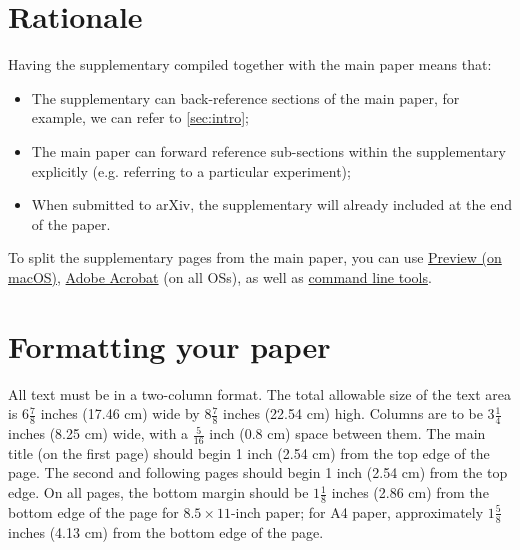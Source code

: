 \clearpage
\setcounter{page}{1}
\maketitlesupplementary


\section{Rationale}
\label{sec:rationale}
% 
Having the supplementary compiled together with the main paper means that:
% 
\begin{itemize}
\item The supplementary can back-reference sections of the main paper, for example, we can refer to \cref{sec:intro};
\item The main paper can forward reference sub-sections within the supplementary explicitly (e.g. referring to a particular experiment); 
\item When submitted to arXiv, the supplementary will already included at the end of the paper.
\end{itemize}
% 
To split the supplementary pages from the main paper, you can use \href{https://support.apple.com/en-ca/guide/preview/prvw11793/mac#:~:text=Delete%20a%20page%20from%20a,or%20choose%20Edit%20%3E%20Delete).}{Preview (on macOS)}, \href{https://www.adobe.com/acrobat/how-to/delete-pages-from-pdf.html#:~:text=Choose%20%E2%80%9CTools%E2%80%9D%20%3E%20%E2%80%9COrganize,or%20pages%20from%20the%20file.}{Adobe Acrobat} (on all OSs), as well as \href{https://superuser.com/questions/517986/is-it-possible-to-delete-some-pages-of-a-pdf-document}{command line tools}.

\section{Formatting your paper}
\label{sec:formatting}


All text must be in a two-column format.
The total allowable size of the text area is $6\frac78$ inches (17.46 cm) wide by $8\frac78$ inches (22.54 cm) high.
Columns are to be $3\frac14$ inches (8.25 cm) wide, with a $\frac{5}{16}$ inch (0.8 cm) space between them.
The main title (on the first page) should begin 1 inch (2.54 cm) from the top edge of the page.
The second and following pages should begin 1 inch (2.54 cm) from the top edge.
On all pages, the bottom margin should be $1\frac{1}{8}$ inches (2.86 cm) from the bottom edge of the page for $8.5 \times 11$-inch paper;
for A4 paper, approximately $1\frac{5}{8}$ inches (4.13 cm) from the bottom edge of the
page.





